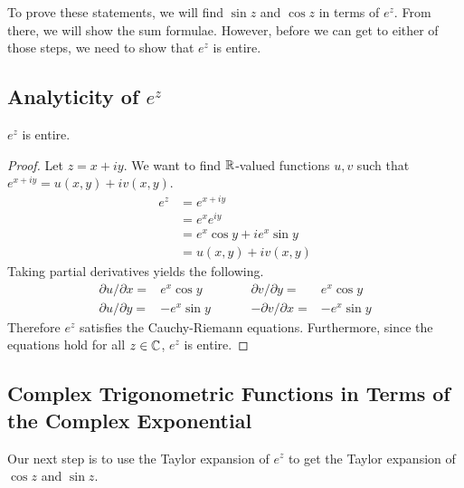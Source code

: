 \documentclass[notitlepage]{problem-solving}
\begin{document}
To prove these statements, we will find $\sin z$ and $\cos z$ in terms of $e^z$.
From there, we will show the sum formulae.
However, before we can get to either of those steps, we need to show that $e^z$ is entire.

\subsection{Analyticity of $e^{z}$}

\begin{proposition}
	$e^z$ is entire.
\end{proposition}
\begin{proof}
	Let $z=x+iy$.
	We want to find $\mathbb{R}$-valued functions $u,v$ such that $e^{x+iy}=u(x,y)+iv(x,y)$.
	\begin{align*}
		e^z &= e^{x+iy}\\
		&= e^x e^{iy}\\
		&= e^x \cos y + ie^x\sin y\\
		&= u(x,y) +iv(x,y)
	\end{align*}
	Taking partial derivatives yields the following.
	\[
		\begin{array}{rlrl}
			\partial u/\partial x =& e^x \cos y  \hspace{1cm}&  \partial v/\partial y =& e^x \cos y\\
			\partial u/\partial y =& -e^x \sin y \hspace{1cm}& -\partial v/\partial x =& -e^x \sin y
		\end{array}
	\]
	Therefore $e^z$ satisfies the Cauchy-Riemann equations.
	Furthermore, since the equations hold for all $z\in\mathbb{C}$, $e^z$ is entire.
\end{proof}

\subsection{Complex Trigonometric Functions in Terms of the Complex Exponential}

Our next step is to use the Taylor expansion of $e^z$ to get the Taylor expansion of $\cos z$ and $\sin z$.
\end{document}
